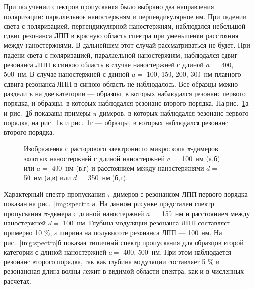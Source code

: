 При получении спектров пропускания было выбрано два направления поляризации: параллельное наностержням и перпендикулярное им. При падении света с поляризацией, перпендикулярной наностержням, наблюдался небольшой сдвиг резонанса ЛПП в красную область спектра при уменьшении расстояния между наностержнями. В дальнейшем этот случай рассматриваться не будет. При падени света с поляризацией, параллельной наностержням, наблюдался сдвиг резонанса ЛПП в синюю область в случае наностержней с длиной $ a = $ 400, 500~нм. В случае наностержней с длиной $ a = $ 100, 150, 200, 300~нм плавного сдвига резонанса ЛПП в синюю область не наблюдалось.
Все образцы можно разделить на две категории --- образцы, в которых наблюдался резонанс первого порядка, и образцы, в которых наблюдался резонанс второго порядка. На рис.~\ref{img:samples}а и рис.~\ref{img:samples}б показаны примеры $ \pi $-димеров, в которых наблюдался резонанс первого порядка, на рис.~\ref{img:samples}в и рис.~\ref{img:samples}г --- образцы, в которых наблюдался резонанс второго порядка.
\begin{figure}[!h]
\caption{Изображения с расторового электронного микроскопа $ \pi $-димеров золотых наностержней с длиной наностержней $ a = $ 100~нм (а,б) или $ a = $ 400~нм (в,г) и расстоянием между наностержнями $ d = $ 50~нм (а,в) или $ d = $ 350~нм (б,г).}
\label{img:samples}
\end{figure}
Характерный спектр пропускания $ \pi $-димеров с резонансом ЛПП первого порядка показан на рис.~\ref{img:spectra}а. На данном рисунке предстален спектр пропускания $ \pi$-димера с длиной наностержней $ a = $ 150~нм и расстоянием между наностержней $ d = $ 100~нм. Глубина модуляции резонанса ЛПП составляет примерно 10 \%, а ширина на полувысоте резонанса ЛПП --- 100~нм. На рис.~\ref{img:spectra}б показан типичный спектр пропускания для образцов второй категории с длиной наностержней $ a = $ 400, 500~нм. При этом наблюдается резонанс второго порядка, так как глубина модуляции составляет 5 \% и резонансная длина волны лежит в видимой области спектра, как и в численных расчетах.
